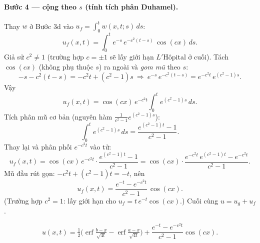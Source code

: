 \paragraph{Bước 4 --- cộng theo $s$ (tính tích phân Duhamel).} Thay $w$ ở Bước 3d vào $u_f=\int_0^t w(x,t;s)\,ds$:
\[
  u_f(x,t)=\int_0^t e^{-s}\,e^{-c^2(t-s)}\,\cos(cx)\,ds.
\]
Giả sử $c^2\ne1$ (trường hợp $c=\pm1$ sẽ lấy giới hạn $L'$Hôpital ở cuối). Tách $\cos(cx)$ (không phụ thuộc $s$) ra ngoài và \emph{gom mũ} theo $s$:
\[
  -s-c^2(t-s)=-c^2 t+(c^2-1)s
  \ \Longrightarrow\ e^{-s}\,e^{-c^2(t-s)}=e^{-c^2 t}\,e^{(c^2-1)s}.
\]
Vậy
\[
  u_f(x,t)=\cos(cx)\,e^{-c^2 t}\int_0^t e^{(c^2-1)s}\,ds.
\]
Tích phân mũ cơ bản (nguyên hàm $\frac{1}{c^2-1}e^{(c^2-1)s}$):
\[
  \int_0^t e^{(c^2-1)s}\,ds=\frac{e^{(c^2-1)t}-1}{c^2-1}.
\]
Thay lại và phân phối $e^{-c^2 t}$ vào tử:
\[
  u_f(x,t)=\cos(cx)\,e^{-c^2 t}\cdot\frac{e^{(c^2-1)t}-1}{c^2-1}
  =\cos(cx)\cdot\frac{e^{-c^2 t}\,e^{(c^2-1)t}-e^{-c^2 t}}{c^2-1}.
\]
Mũ đầu rút gọn: $-c^2 t+(c^2-1)t=-t$, nên
\[
  u_f(x,t)=\frac{e^{-t}-e^{-c^2 t}}{c^2-1}\,\cos(cx).
\]
(Trường hợp $c^2=1$: lấy giới hạn cho $u_f=t\,e^{-t}\cos(cx)$.) Cuối cùng $u=u_g+u_f$.
\begin{nhobox}
\[
  u(x,t)=\tfrac12\Big(\operatorname{erf}\tfrac{b-x}{\sqrt{4t}}-\operatorname{erf}\tfrac{a-x}{\sqrt{4t}}\Big)
  +\frac{e^{-t}-e^{-c^2 t}}{c^2-1}\cos(cx).
\]
\end{nhobox}